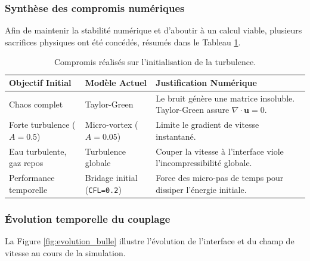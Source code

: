 \subsubsection{Synthèse des compromis numériques}
Afin de maintenir la stabilité numérique et d'aboutir à un calcul viable, plusieurs sacrifices physiques ont été concédés, résumés dans le Tableau \ref{tab:sacrifices}.

\begin{table}[hbt!]
    \centering
    \begin{tabular}{@{}p{4cm}p{4cm}p{7cm}@{}}
    \toprule
    \textbf{Objectif Initial} & \textbf{Modèle Actuel} & \textbf{Justification Numérique} \\ \midrule
    Chaos complet & Taylor-Green & Le bruit génère une matrice insoluble. Taylor-Green assure $\nabla \cdot \mathbf{u} = 0$. \\
    Forte turbulence ($A=0.5$) & Micro-vortex ($A=0.05$) & Limite le gradient de vitesse instantané. \\
    Eau turbulente, gaz repos & Turbulence globale & Couper la vitesse à l'interface viole l'incompressibilité globale. \\
    Performance temporelle & Bridage initial (\texttt{CFL=0.2}) & Force des micro-pas de temps pour dissiper l'énergie initiale. \\ \bottomrule
    \end{tabular}
    \caption{Compromis réalisés sur l'initialisation de la turbulence.}
    \label{tab:sacrifices}
\end{table}

\subsubsection{Évolution temporelle du couplage}
La Figure \ref{fig:evolution_bulle} illustre l'évolution de l'interface et du champ de vitesse au cours de la simulation.

